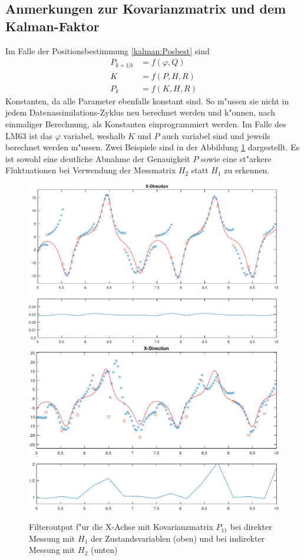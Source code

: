 \begin{refsection}
\subsection{Anmerkungen zur Kovarianzmatrix und dem Kalman-Faktor}
Im Falle der Positionsbestimmung \eqref{kalman:Posbest} sind
\begin{align*}
P_{k+1|k}&=f(\varphi, Q)\\
K&=f(P,H,R)\\
P_{k}&=f(K,H,R)
\end{align*}
Konstanten, da alle Parameter ebenfalls konstant sind. So m"ussen
sie nicht in jedem Datenassimila\-tions-Zyklus neu berechnet werden
und k"onnen, nach einmaliger Berechnung, als Konstanten einprogrammiert
werden. Im Falle des LM63 ist das $\varphi$ variabel, weshalb $K$
und $P$ auch variabel sind und jeweils berechnet werden m"ussen.
Zwei Beispiele sind in der Abbildung \ref{kalman:Kovarianz}
dargestellt. Es ist sowohl eine deutliche Abnahme der Genauigkeit
$P$ sowie eine st"arkere Fluktuationen bei Verwendung der Messmatrix $H_{2}$
statt $H_{1}$ zu erkennen.

\begin{figure}
\centering
\includegraphics[width=\hsize]{kalman/figures/H1R10S2XP.pdf}
\includegraphics[width=\hsize]{kalman/figures/H2R10S2XP.pdf}
\caption{Filteroutput f"ur die X-Achse mit Kovarianzmatrix $P_{11}$ bei direkter Messung mit $H_{1}$ der Zustandsvariablen (oben) und bei indirekter Messung mit $H_{2}$ (unten)}
\label{kalman:Kovarianz}
\end{figure}


\end{refsection}
